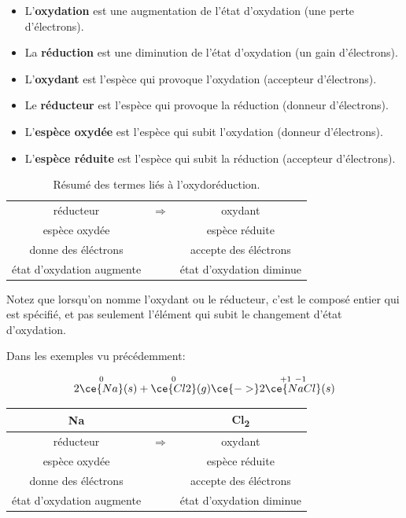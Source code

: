 \documentclass[
  11pt,
  a4paper,
  openany]{book}
\providecommand{\tightlist}{%
  \setlength{\itemsep}{0pt}\setlength{\parskip}{0pt}}
\begin{document}
\begin{itemize}
\tightlist
\item
  L'\textbf{oxydation} est une augmentation de l'état d'oxydation (une perte d'électrons).
\item
  La \textbf{réduction} est une diminution de l'état d'oxydation (un gain d'électrons).
\item
  L'\textbf{oxydant} est l'espèce qui provoque l'oxydation (accepteur d'électrons).
\item
  Le \textbf{réducteur} est l'espèce qui provoque la réduction (donneur d'électrons).
\item
  L'\textbf{espèce oxydée} est l'espèce qui subit l'oxydation (donneur d'électrons).
\item
  L'\textbf{espèce réduite} est l'espèce qui subit la réduction (accepteur d'électrons).
\end{itemize}

\begin{longtable}[]{@{}ccc@{}}
\caption{\label{tab:tab-NO-summary} Résumé des termes liés à l'oxydoréduction.}\tabularnewline
\toprule\noalign{}
\endfirsthead
\endhead
\bottomrule\noalign{}
\endlastfoot
réducteur & \(\Rightarrow\) & oxydant \\
espèce oxydée & & espèce réduite \\
donne des éléctrons & & accepte des éléctrons \\
état d'oxydation augmente & & état d'oxydation diminue \\
\end{longtable}

Notez que lorsqu'on nomme l'oxydant ou le réducteur, c'est le composé entier qui est spécifié, et pas seulement l'élément qui subit le changement d'état d'oxydation.

Dans les exemples vu précédemment:

\[
2\overset{0}{\ce{Na}}(s) + \overset{0}{\ce{Cl2}}(g) \ce{->} 2\overset{+1\ -1}{\ce{NaCl}}(s)
\]

\begin{longtable}[]{@{}ccc@{}}
\toprule\noalign{}
Na & & Cl\textsubscript{2} \\
\midrule\noalign{}
\endhead
\bottomrule\noalign{}
\endlastfoot
réducteur & \(\Rightarrow\) & oxydant \\
espèce oxydée & & espèce réduite \\
donne des éléctrons & & accepte des éléctrons \\
état d'oxydation augmente & & état d'oxydation diminue \\
\end{longtable}
\end{document}
